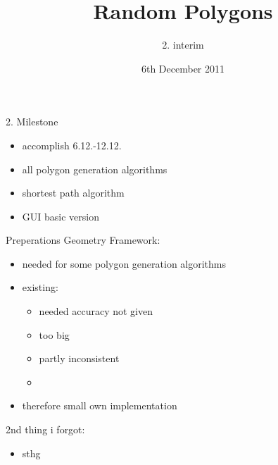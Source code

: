 \documentclass[ucs,10pt]{beamer}
\title[Random Polygons]{Random Polygons}
\subtitle{2. interim}
\institute[FU Berlin]{Freie Universität Berlin}
\date[06.12.2011]{6th December 2011}
\begin{document}
\begin{frame}[plain]
  \titlepage
\end{frame}

\begin{frame}{2. Milestone}
  \begin{itemize}
  \item accomplish 6.12.-12.12.
  \item all polygon generation algorithms
  \item shortest path algorithm
  \item GUI basic version
  \end{itemize}
\end{frame}

\begin{frame}{Preperations}
  Geometry Framework:
  \begin{itemize}
    \item needed for some polygon generation algorithms
    \item existing:
    \begin{itemize}
      \item needed accuracy not given
      \item too big 
      \item partly inconsistent
      \item 
    \end{itemize}
    \item therefore small own implementation
  \end{itemize}
  \vspace*{1em}
  2nd thing i forgot:
  \begin{itemize}
    \item sthg
  \end{itemize}
\end{frame}
\end{document}
